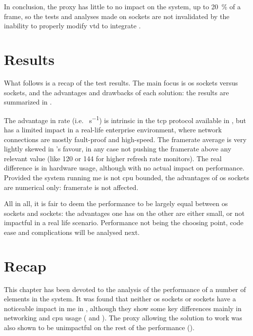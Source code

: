 In conclusion, the proxy has little to no impact on the system, up to \SI{20}{\percent} of a frame, so the tests and analyses made on  sockets are not invalidated by the inability to properly modify \gls{vtd} to integrate .

\section{Results}\label{sc:performance:results}

What follows is a recap of the test results. The main focus is \gls{os} sockets versus  sockets, and the advantages and drawbacks of each solution: the results are summarized in .



The advantage in rate (i.e. \si{\packets\per\second}) is intrinsic in the \gls{tcp} protocol available in , but has a limited impact in a real-life enterprise environment, where network connections are mostly fault-proof and high-speed. The framerate average is very lightly skewed in 's favour, in any case not pushing the framerate above any relevant value (like \SI{120}{\fps} or \SI{144}{\fps} for higher refresh rate monitors). The real difference is in hardware usage, although with no actual impact on performance. Provided the system running \gls{me} is not \gls{cpu} bounded, the advantages of \gls{os} sockets are numerical only: framerate is not affected.

All in all, it is fair to deem the performance to be largely equal between \gls{os} sockets and  sockets: the advantages one has on the other are either small, or not impactful in a real life scenario. Performance not being the choosing point, code ease and complications will be analysed next.

\section{Recap}\label{sc:performance:recap}

This chapter has been devoted to the analysis of the performance of a number of elements in the system. It was found that neither \gls{os} sockets or  sockets have a noticeable impact in \gls{me} in , although they show some key differences mainly in networking and \gls{cpu} usage ( and ). The proxy allowing the  solution to work was also shown to be unimpactful on the rest of the performance ().
